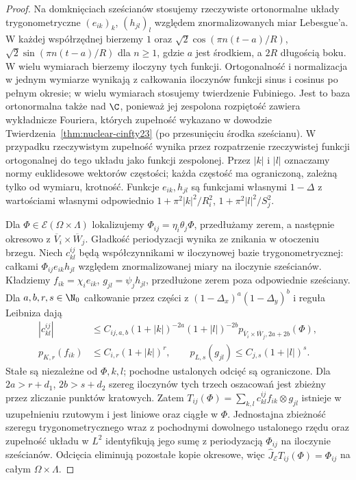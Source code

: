 \begin{proof}
Na domknięciach sześcianów stosujemy rzeczywiste
ortonormalne układy trygonometryczne $(e_{ik})_k$,
$(h_{jl})_l$ względem znormalizowanych miar Lebesgue'a.
W każdej współrzędnej bierzemy $1$ oraz
$\sqrt2\cos(\pi n(t-a)/R)$, $\sqrt2\sin(\pi n(t-a)/R)$
dla $n\ge1$, gdzie $a$ jest środkiem, a $2R$ długością
boku. W wielu wymiarach bierzemy iloczyny tych funkcji.
Ortogonalność i normalizacja w jednym wymiarze
wynikają z całkowania iloczynów funkcji sinus
i cosinus po pełnym okresie; w wielu wymiarach
stosujemy twierdzenie Fubiniego. Jest to baza
ortonormalna także nad $\C$, ponieważ jej zespolona
rozpiętość zawiera wykładnicze Fouriera, których
zupełność wykazano w dowodzie
Twierdzenia~\ref{thm:nuclear-cinfty23} (po przesunięciu
środka sześcianu). W przypadku rzeczywistym zupełność
wynika przez rozpatrzenie rzeczywistej funkcji
ortogonalnej do tego układu jako funkcji zespolonej.
Przez $|k|$ i $|l|$ oznaczamy normy euklidesowe
wektorów częstości; każda częstość ma ograniczoną,
zależną tylko od wymiaru, krotność.
Funkcje $e_{ik},h_{jl}$ są funkcjami własnymi
$1-\Delta$ z wartościami własnymi odpowiednio
$1+\pi^2|k|^2/R_i^2$, $1+\pi^2|l|^2/S_j^2$.

Dla $\Phi\in\mathcal E(\Omega\times\Lambda)$
lokalizujemy $\Phi_{ij}=\eta_i\theta_j\Phi$,
przedłużamy zerem, a następnie okresowo z
$\overline V_i\times\overline W_j$.
Gładkość periodyzacji wynika ze znikania w otoczeniu
brzegu. Niech $c_{kl}^{ij}$ będą współczynnikami
w iloczynowej bazie trygonometrycznej: całkami
$\Phi_{ij}e_{ik}h_{jl}$ względem znormalizowanej
miary na iloczynie sześcianów. Kładziemy
$f_{ik}=\chi_i e_{ik}$, $g_{jl}=\psi_j h_{jl}$,
przedłużone zerem poza odpowiednie sześciany.
Dla $a,b,r,s\in\N_0$ całkowanie przez części z
$(1-\Delta_x)^a(1-\Delta_y)^b$ i reguła Leibniza dają
\[
 \begin{aligned}
 |c_{kl}^{ij}|&\le C_{ij,a,b}(1+|k|)^{-2a}
 (1+|l|)^{-2b}
 p_{\overline V_i\times\overline W_j,2a+2b}(\Phi),\\
 p_{K,r}(f_{ik})&\le C_{i,r}(1+|k|)^r,\qquad
 p_{L,s}(g_{jl})\le C_{j,s}(1+|l|)^s.
 \end{aligned}
\]
Stałe są niezależne od $\Phi,k,l$; pochodne ustalonych
odcięć są ograniczone. Dla $2a>r+d_1$, $2b>s+d_2$
szereg iloczynów tych trzech oszacowań jest zbieżny
przez zliczanie punktów kratowych.
Zatem
$T_{ij}(\Phi)=\sum_{k,l}c_{kl}^{ij}f_{ik}\otimes g_{jl}$
istnieje w uzupełnieniu rzutowym i jest liniowe
oraz ciągłe w $\Phi$.
Jednostajna zbieżność szeregu trygonometrycznego
wraz z pochodnymi dowolnego ustalonego rzędu oraz
zupełność układu w $L^2$ identyfikują jego sumę
z periodyzacją $\Phi_{ij}$ na iloczynie sześcianów.
Odcięcia eliminują pozostałe kopie okresowe, więc
$\widehat J_{\mathcal E}T_{ij}(\Phi)=\Phi_{ij}$
na całym $\Omega\times\Lambda$.


\end{proof}
